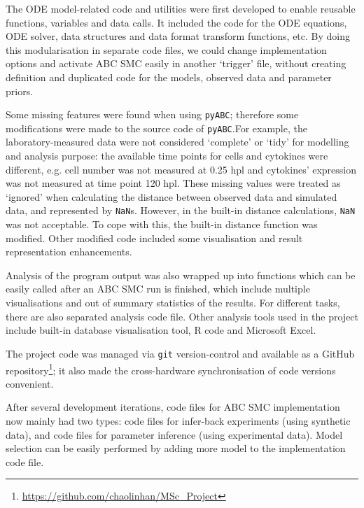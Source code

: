 The ODE model-related code and utilities were first developed to enable reusable functions, variables and data calls. It included the code for the ODE equations, ODE solver, data structures and data format transform functions, etc. By doing this modularisation in separate code files, we could change implementation options and activate ABC SMC easily in another `trigger' file, without creating definition and duplicated code for the models, observed data and parameter priors.

Some missing features were found when using \verb|pyABC|; therefore some modifications were made to the source code of \verb|pyABC|.For example, the laboratory-measured data were not considered `complete' or `tidy' for modelling and analysis purpose: the available time points for cells and cytokines were different, e.g. cell number was not measured at 0.25 hpl and cytokines' expression was not measured at time point 120 hpl. These missing values were treated as `ignored' when calculating the distance between observed data and simulated data, and represented by \verb|NaN|s. However, in the built-in distance calculations, \verb|NaN| was not acceptable. To cope with this, the built-in distance function was modified. Other modified code included some visualisation and result representation enhancements.

Analysis of the program output was also wrapped up into functions which can be easily called after an ABC SMC run is finished, which include multiple visualisations and out of summary statistics of the results. For different tasks, there are also separated analysis code file. Other analysis tools used in the project include built-in database visualisation tool, R code and Microsoft Excel.

The project code was managed via \verb|git| version-control and available as a GitHub repository\footnote{\url{https://github.com/chaolinhan/MSc_Project}}; it also made the cross-hardware synchronisation of code versions convenient.

After several development iterations, code files for ABC SMC implementation now mainly had two types: code files for infer-back experiments (using synthetic data), and code files for parameter inference (using experimental data). Model selection can be easily performed by adding more model to the implementation code file.



